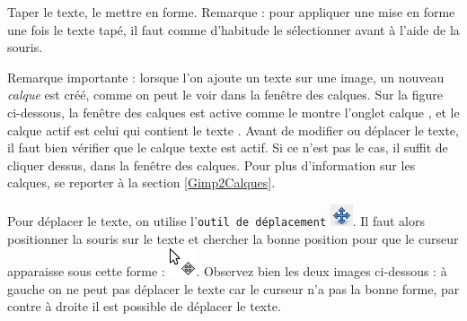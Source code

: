 
Taper le texte, le mettre en forme. Remarque : pour appliquer une mise en forme une fois le texte tapé, il faut comme d'habitude le sélectionner avant à l'aide de la souris.


Remarque importante\label{remarqueCalque} : lorsque l'on ajoute un texte sur une image, un nouveau \emph{calque} est créé, comme on peut le voir dans la fenêtre des calques. Sur la figure ci-dessous, la fenêtre des calques est active comme le montre l'onglet calque , et le calque actif est celui qui contient le texte . Avant de modifier ou déplacer le texte, il faut bien vérifier que le calque texte est actif. Si ce n'est pas le cas, il suffit de cliquer dessus, dans la fenêtre des calques. Pour plus d'information sur les calques, se reporter à la section \vref{Gimp2Calques}. 


Pour déplacer le texte, on utilise l'\texttt{outil de déplacement} \includegraphics[width=.6cm]{./images/image02/iconeDeplace}. Il faut alors positionner la souris sur le texte et chercher la bonne position pour que le curseur apparaisse sous cette forme : \includegraphics[width=.6cm]{./images/image02/iconeTexteBouge}. Observez bien les deux images ci-dessous : à gauche on ne peut pas déplacer le texte car le curseur n'a pas la bonne forme, par contre à droite il est possible de déplacer le texte.


